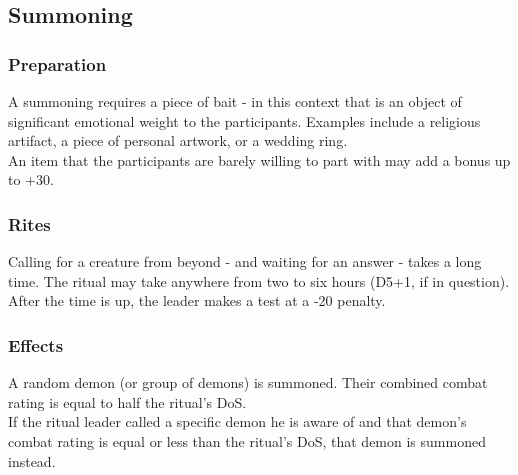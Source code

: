 %
\subsection*{Summoning}
\label{ritual:summoning}
\subsubsection*{Preparation}
A summoning requires a piece of bait -
in this context that is an object of significant emotional weight to the participants.
Examples include a religious artifact, a piece of personal artwork, or a wedding ring.
\\%
An item that the participants are barely willing to part with may add a bonus up to +30.
\subsubsection*{Rites}
Calling for a creature from beyond - and waiting for an answer - takes a long time.
The ritual may take anywhere from two to six hours (D5+1, if in question).
\\%
After the time is up, the leader makes a test at a -20 penalty.
\subsubsection*{Effects}
A random demon (or group of demons) is summoned.
Their combined combat rating is equal to half the ritual's DoS.
\\%
If the ritual leader called a specific demon he is aware of
and that demon's combat rating is equal or less than the ritual's DoS,
that demon is summoned instead.

